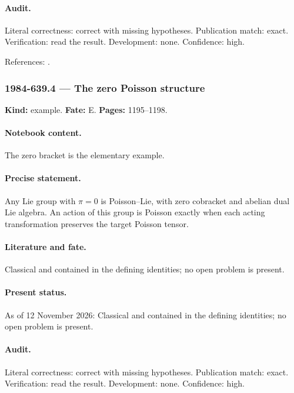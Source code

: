 \paragraph{Audit.} Literal correctness: correct with missing hypotheses. Publication match: exact. Verification: read the result. Development: none. Confidence: high.

\noindent References: \citep{drinfeld1983hamiltonian}.\par

\subsubsection{1984-639.4 --- The zero Poisson structure}

\label{item:1984-639.4}

\noindent\textbf{Kind:} example. \textbf{Fate:} E. \textbf{Pages:} 1195--1198.\par

\paragraph{Notebook content.} The zero bracket is the elementary example.

\paragraph{Precise statement.} Any Lie group with \(\pi=0\) is Poisson--Lie, with zero cobracket and abelian dual Lie algebra. An action of this group is Poisson exactly when each acting transformation preserves the target Poisson tensor.

\paragraph{Literature and fate.} Classical and contained in the defining identities; no open problem is present.

\paragraph{Present status.} As of 12 November 2026: Classical and contained in the defining identities; no open problem is present.

\paragraph{Audit.} Literal correctness: correct with missing hypotheses. Publication match: exact. Verification: read the result. Development: none. Confidence: high.

